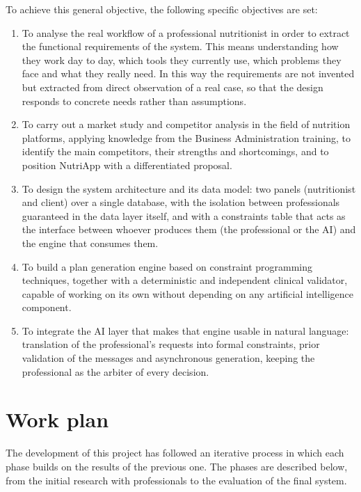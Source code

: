 To achieve this general objective, the following specific objectives are set:

\begin{enumerate}
    \item To analyse the real workflow of a professional nutritionist in order to extract the functional requirements of the system. This means understanding how they work day to day, which tools they currently use, which problems they face and what they really need. In this way the requirements are not invented but extracted from direct observation of a real case, so that the design responds to concrete needs rather than assumptions.

    \item To carry out a market study and competitor analysis in the field of nutrition platforms, applying knowledge from the Business Administration training, to identify the main competitors, their strengths and shortcomings, and to position NutriApp with a differentiated proposal.

    \item To design the system architecture and its data model: two panels (nutritionist and client) over a single database, with the isolation between professionals guaranteed in the data layer itself, and with a constraints table that acts as the interface between whoever produces them (the professional or the AI) and the engine that consumes them.

    \item To build a plan generation engine based on constraint programming techniques, together with a deterministic and independent clinical validator, capable of working on its own without depending on any artificial intelligence component.

    \item To integrate the AI layer that makes that engine usable in natural language: translation of the professional's requests into formal constraints, prior validation of the messages and asynchronous generation, keeping the professional as the arbiter of every decision.
\end{enumerate}


\section*{Work plan}
The development of this project has followed an iterative process in which each phase builds on the results of the previous one. The phases are described below, from the initial research with professionals to the evaluation of the final system.

